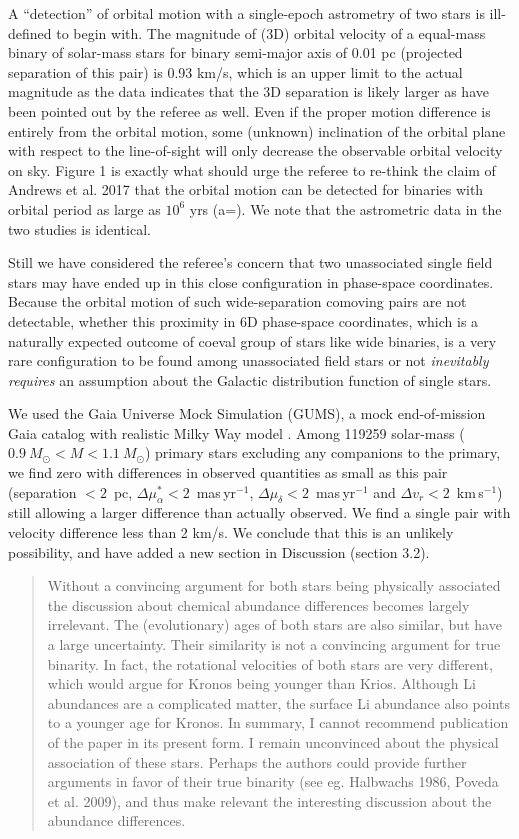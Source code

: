\documentclass[12pt]{article}
\begin{document}
A ``detection'' of orbital motion with a single-epoch astrometry of two
stars is ill-defined to begin with.
The magnitude of (3D) orbital velocity of a equal-mass binary of solar-mass
stars for binary semi-major axis of 0.01 pc (projected separation of this pair)
is 0.93 km/s,
which is an upper limit to the actual magnitude as the data
indicates that the 3D separation is likely larger as have been pointed
out by the referee as well.
Even if the proper motion difference is entirely from the orbital motion, some
(unknown) inclination of the orbital plane with respect to the line-of-sight
will only decrease the observable orbital velocity on sky.
Figure 1 is exactly what should urge the referee to re-think the claim of
Andrews et al. 2017 that the orbital motion can be detected for binaries with
orbital period as large as $10^6$ yrs (a=).
We note that the astrometric data in the two studies is identical.

Still we have considered the referee's concern that two unassociated
single field stars may have ended up in this close configuration in
phase-space coordinates. Because the orbital motion of such
wide-separation comoving pairs are not detectable, whether this
proximity in 6D phase-space coordinates, which is a naturally expected
outcome of coeval group of stars like wide binaries, is a very rare
configuration to be found among unassociated field stars or not
\emph{inevitably requires} an assumption about the Galactic distribution
function of single stars.

We used the Gaia Universe Mock Simulation (GUMS), a mock
end-of-mission Gaia catalog with realistic Milky Way model \citep{gums}.
Among 119259 solar-mass ($0.9~M_\odot< M < 1.1~M_\odot$) primary stars excluding
any companions to the primary, we find zero with differences in observed
quantities as small as this pair
(separation $<2$~pc,
$\Delta \mu_\alpha^* < 2$~mas\,yr$^{-1}$,
$\Delta \mu_\delta<2$~mas\,yr$^{-1}$ and
$\Delta v_r < 2$~km\,s$^{-1}$) still
allowing a larger difference than actually observed.
We find a single pair with velocity difference less than 2 km/s.
We conclude that this is an unlikely possibility, and 
have added a new section in Discussion (section 3.2).

\begin{quote}
Without a convincing argument for both stars being physically associated
the discussion about chemical abundance differences becomes largely
irrelevant.
The (evolutionary) ages of both stars are also similar, but have a large
uncertainty. Their similarity is not a convincing argument for true binarity.
In fact, the rotational velocities of both stars are very different,
which would argue for Kronos being younger than Krios. Although Li
abundances are a complicated matter, the surface Li abundance also
points to a younger age for Kronos. 
In summary, I cannot recommend
publication of the paper in its present form. I remain unconvinced about
the physical association of these stars. Perhaps the authors could
provide further arguments in favor of their true binarity (see eg.
Halbwachs 1986, Poveda et al. 2009), and thus make relevant the
interesting discussion about the abundance differences.
\end{quote}
\end{document}
